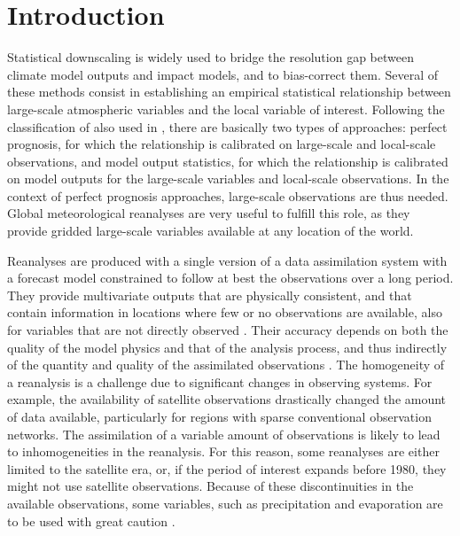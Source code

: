 \documentclass{ametsoc}
\begin{document}




\section{Introduction}

Statistical downscaling is widely used to bridge the resolution gap between climate model outputs and impact models, and to bias-correct them. Several of these methods consist in establishing an empirical statistical relationship between large-scale atmospheric variables and the local variable of interest. Following the classification of \citet{Rummukainen1997} also used in \citet{Maraun2010}, there are basically two types of approaches: perfect prognosis, for which the relationship is calibrated on large-scale and local-scale observations, and model output statistics, for which the relationship is calibrated on model outputs for the large-scale variables and local-scale observations. In the context of perfect prognosis approaches, large-scale observations are thus needed. Global meteorological reanalyses are very useful to fulfill this role, as they provide gridded large-scale variables available at any location of the world.

Reanalyses are produced with a single version of a data assimilation system with a forecast model constrained to follow at best the observations over a long period. They provide multivariate outputs that are physically consistent, and that contain information in locations where few or no observations are available, also for variables that are not directly observed \citep{Gelaro2017}. Their accuracy depends on both the quality of the model physics and that of the analysis process, and thus indirectly of the quantity and quality of the assimilated observations \citep{Dee2011a}. The homogeneity of a reanalysis is a challenge due to significant changes in observing systems. For example, the availability of satellite observations drastically changed the amount of data available, particularly for regions with sparse conventional observation networks. The assimilation of a variable amount of observations is likely to lead to inhomogeneities in the reanalysis. For this reason, some reanalyses are either limited to the satellite era, or, if the period of interest expands before 1980, they might not use satellite observations. Because of these discontinuities in the available observations, some variables, such as precipitation and evaporation are to be used with great caution \citep{Kobayashi2015}.
\end{document}
